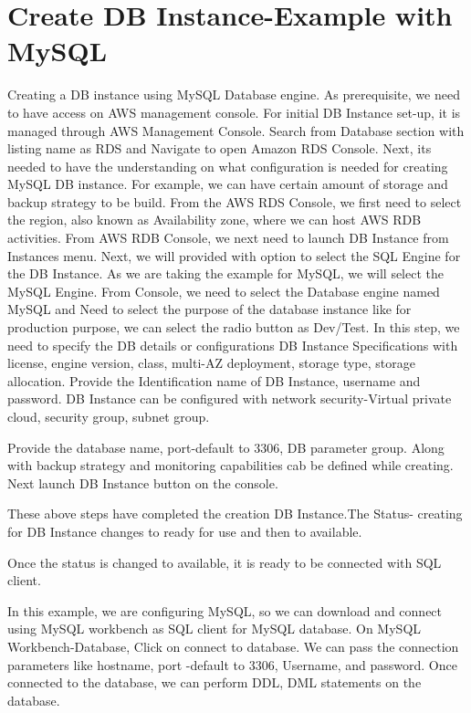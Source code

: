 \section{Create DB Instance-Example with MySQL}
Creating a DB instance using MySQL Database engine.
As prerequisite, we need to have access on AWS management console.
For initial DB Instance set-up, it is managed through AWS Management
Console. 
Search from Database section with listing name as RDS and
Navigate to open Amazon RDS Console.
Next, its needed to have the understanding on what configuration is needed 
for creating MySQL DB instance. For example, we can have certain amount of 
storage and backup strategy to be build.
From the AWS RDS Console, we first need to select the region, also 
known as Availability zone, where we can host AWS RDB activities.
From AWS RDB Console, we next need to launch DB Instance from 
Instances menu.
Next, we will provided with option to select the SQL Engine for the DB 
Instance. As we are taking the example for MySQL, we will select the 
MySQL Engine.
From Console, we need to select the Database engine named MySQL and
Need to select the purpose of the database instance like for 
production purpose, we can select the radio button as Dev/Test.
In this step, we need to specify the DB details or configurations
DB Instance Specifications with license, engine version, class, multi-AZ 
deployment, storage type, storage allocation.
Provide the Identification name of DB Instance, username and password.
DB Instance can be configured with network security-Virtual private 
cloud, security group, subnet group.

Provide the database name, port-default to 3306, DB parameter group. 
Along with backup strategy and monitoring capabilities cab be defined 
while creating.
Next launch DB Instance button on the console.

These above steps have completed the creation DB Instance.The Status- 
creating for DB Instance changes to ready for use and then to available.

Once the status is changed to available, it is ready to be connected 
with SQL client.

In this example, we are configuring MySQL, so we can download and connect 
using MySQL workbench as SQL client for MySQL database. 
On MySQL Workbench-Database, Click on connect to database. We 
can pass the connection parameters like hostname, port -default to 3306, 
Username, and password.
Once connected to the database, we can perform DDL, DML 
statements on the database. 

